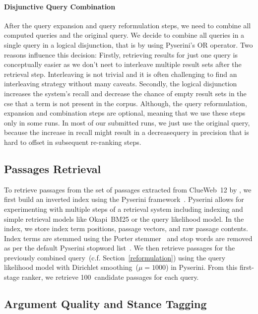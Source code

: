 \paragraph{Disjunctive Query Combination}
After the query expansion and query reformulation steps, we need to combine all computed queries and the original query.
We decide to combine all queries in a single query in a logical disjunction, that is by using Pyserini's OR operator.
Two reasons influence this decision:
Firstly, retrieving results for just one query is conceptually easier as we don't neet to interleave multiple result sets after the retrieval step.
Interleaving is not trivial and it is often challenging to find an interleaving strategy without many caveats.
Secondly, the logical disjunction increases the system's recall and decrease the chance of empty result sets in the cse that a term is not present in the corpus.
Although, the query reformulation, expansion and combination steps are optional, meaning that we use these steps only in some runs. In most of our submitted runs, we just use the original query, because the increase in recall might result in a decreasequery in precision that is hard to offset in subsequent re-ranking steps.

\subsection{Passages Retrieval}\label{retrieval}

To retrieve passages from the set of passages extracted from ClueWeb~12 by \citet{BondarenkoFKSGBPBSWPH2022}, we first build an inverted index using the Pyserini framework~\cite{LinMLYPN2021}.
Pyserini allows for experimenting with multiple steps of a retrieval system including indexing and simple retrieval models like Okapi~BM25 or the query likelihood model.
In the index, we store index term positions, passage vectors, and raw passage contents.
Index terms are stemmed using the Porter stemmer~\cite{Porter1980} and stop words are removed as per the default Pyserini stopword list~\cite{LinMLYPN2021}.
We then retrieve passages for the previously combined query~(c.f. Section~\ref{reformulation}) using the query likelihood model with Dirichlet smoothing~(\( \mu = 1000 \)) in Pyserini.
From this first-stage ranker, we retrieve 100~candidate passages for each query.

\subsection{Argument Quality and Stance Tagging}
\label{argument-tagging}


